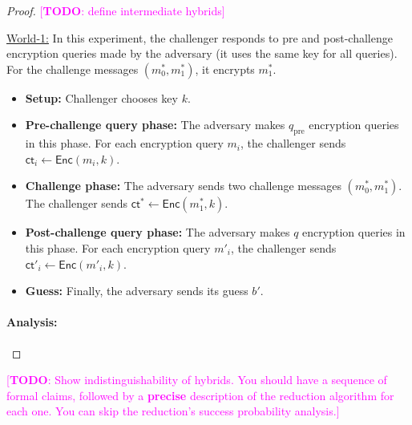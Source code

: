 \documentclass[10pt,addpoints]{exam}
\newcommand{\enc}{\mathsf{Enc}}
\newcommand{\TODO}[1]{\textcolor{magenta}{[\textbf{TODO}: #1]}}
\newcommand{\qpre}{q_{\mathrm{pre}}}
\newcommand{\ct}{\mathsf{ct}}
\theoremstyle{definition}
\begin{document}
\begin{proof}
        \vspace{10pt}

        \TODO{define intermediate hybrids}

        \vspace{10pt}


        \underline{World-1:} In this experiment, the challenger responds to pre and post-challenge encryption queries made by the adversary (it uses the same key for all queries). For the challenge messages $(m^*_0, m^*_1)$, it encrypts $m^*_1$. 

        \begin{itemize}[noitemsep]
            \item \textbf{Setup:} Challenger chooses key $k$.
            \item \textbf{Pre-challenge query phase:} The adversary makes $\qpre$ encryption queries in this phase. For each encryption query $m_i$, the challenger sends $\ct_i \gets \enc(m_i, k)$.
            \item \textbf{Challenge phase:} The adversary sends two challenge messages $(m^*_0, m^*_1)$. The challenger sends $\ct^* \gets \enc(m^*_1, k)$. 
            \item \textbf{Post-challenge query phase:} The adversary makes $q$ encryption queries in this phase. For each encryption query $m'_i$, the challenger sends $\ct'_i \gets \enc(m'_i, k)$.
            \item \textbf{Guess:} Finally, the adversary sends its guess $b'$.
        \end{itemize}



        \paragraph{Analysis: }
        \end{proof}

        \TODO{Show indistinguishability of hybrids. You should have a sequence of formal claims, followed by a \textbf{precise} description of the reduction algorithm for each one. You can skip the reduction's success probability analysis.}
\end{document}

